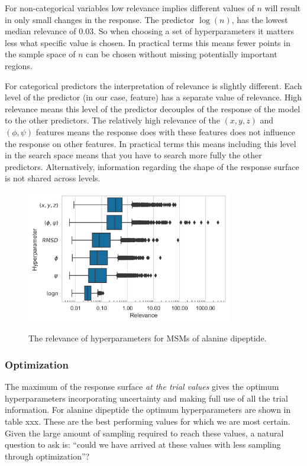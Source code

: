 For non-categorical variables low relevance implies different values of $n$ will result in only small changes in the response. The predictor  $\log{(n)}$, has the lowest median relevance of $0.03$. So when choosing a set of hyperparameters it matters less what specific value is chosen. In practical terms this means fewer points in the sample space of $n$ can be chosen without missing potentially important regions. 

For categorical predictors the interpretation of relevance is slightly different. Each level of the predictor (in our case, feature) has a separate value of relevance. High relevance means this level of the predictor  decouples of the response of the model to the other predictors. The relatively high relevance of the $(x,y,z)$ and $(\phi, \psi)$ features means the response does with these features does not influence the response on other features. In practical terms this means including this level in the search space means that you have to search more fully the other predictors. Alternatively, information regarding the shape of the response surface is not shared across levels. 

\begin{figure}
    \centering
    \caption{The relevance of hyperparameters for MSMs of alanine dipeptide. }
    \includegraphics[width=0.8\textwidth]{chapters/msm_optimization/figures/ala1_relevance.png}
    \label{fig:ala1_relevance}
\end{figure}


\subsubsection{Optimization}

The maximum of the response surface \emph{at the trial values} gives the optimum hyperparameters incorporating uncertainty and making full use of all the trial information. For alanine dipeptide the optimum hyperparameters are shown in table xxx. These are the best performing values for which we are most certain.  Given the large amount of sampling required to reach these values, a natural question to ask is: ``could we have arrived at these values with less sampling through optimization''?

